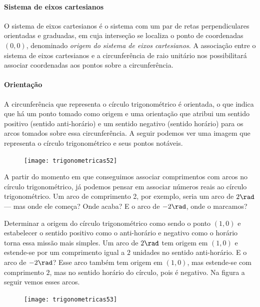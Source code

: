 \paragraph{Sistema de eixos cartesianos}

O sistema de eixos cartesianos é o sistema com um par de retas perpendiculares orientadas e graduadas, em cuja interseção se localiza o ponto de coordenadas $(0,0)$, denominado \textit{origem do sistema de eixos cartesianos}. A associação entre o sistema de eixos cartesianos e a circunferência de raio unitário nos possibilitará associar coordenadas aos pontos sobre a circunferência.

\paragraph{Orientação}

A circunferência que representa o círculo trigonométrico é orientada, o que indica que há um ponto tomado como origem e uma orientação que atribui um sentido positivo (sentido anti-horário) e um sentido negativo (sentido horário) para os arcos tomados sobre essa circunferência. A seguir podemos ver uma imagem que representa o círculo trigonométrico e seus pontos notáveis.

\begin{figure}[H]
\centering

\texttt{[image: trigonometricas52]}
\end{figure}

A partir do momento em que conseguimos associar comprimentos com arcos no círculo trigonométrico, já podemos pensar em associar números reais ao círculo trigonométrico. Um arco de comprimento 2, por exemplo, seria um arco de $2 \rad$ --– mas onde ele começa? Onde acaba? E o arco de $-2\rad$, onde o marcamos?

Determinar a origem do círculo trigonométrico como sendo o ponto $(1,0)$ e estabelecer o sentido positivo como o anti-horário e negativo como o horário torna essa missão mais simples. Um arco de $2\rad$ tem origem em $(1,0)$ e estende-se por um comprimento igual a $2$ unidades no sentido anti-horário. E o arco de $-2 \rad$? Esse arco também tem origem em $(1,0)$, mas estende-se com comprimento $2$, mas no sentido horário do círculo, pois é negativo. Na figura a seguir vemos esses arcos.

\begin{figure}[H]
\centering

\texttt{[image: trigonometricas53]}
\end{figure}

